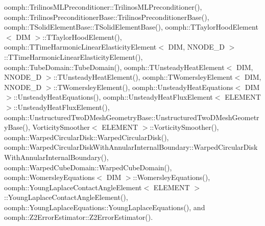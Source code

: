 oomph\+::\+Trilinos\+M\+L\+Preconditioner\+::\+Trilinos\+M\+L\+Preconditioner(), oomph\+::\+Trilinos\+Preconditioner\+Base\+::\+Trilinos\+Preconditioner\+Base(), oomph\+::\+T\+Solid\+Element\+Base\+::\+T\+Solid\+Element\+Base(), oomph\+::\+T\+Taylor\+Hood\+Element$<$ D\+I\+M $>$\+::\+T\+Taylor\+Hood\+Element(), oomph\+::\+T\+Time\+Harmonic\+Linear\+Elasticity\+Element$<$ D\+I\+M, N\+N\+O\+D\+E\+\_\+D $>$\+::\+T\+Time\+Harmonic\+Linear\+Elasticity\+Element(), oomph\+::\+Tube\+Domain\+::\+Tube\+Domain(), oomph\+::\+T\+Unsteady\+Heat\+Element$<$ D\+I\+M, N\+N\+O\+D\+E\+\_\+D $>$\+::\+T\+Unsteady\+Heat\+Element(), oomph\+::\+T\+Womersley\+Element$<$ D\+I\+M, N\+N\+O\+D\+E\+\_\+D $>$\+::\+T\+Womersley\+Element(), oomph\+::\+Unsteady\+Heat\+Equations$<$ D\+I\+M $>$\+::\+Unsteady\+Heat\+Equations(), oomph\+::\+Unsteady\+Heat\+Flux\+Element$<$ E\+L\+E\+M\+E\+N\+T $>$\+::\+Unsteady\+Heat\+Flux\+Element(), oomph\+::\+Unstructured\+Two\+D\+Mesh\+Geometry\+Base\+::\+Unstructured\+Two\+D\+Mesh\+Geometry\+Base(), Vorticity\+Smoother$<$ E\+L\+E\+M\+E\+N\+T $>$\+::\+Vorticity\+Smoother(), oomph\+::\+Warped\+Circular\+Disk\+::\+Warped\+Circular\+Disk(), oomph\+::\+Warped\+Circular\+Disk\+With\+Annular\+Internal\+Boundary\+::\+Warped\+Circular\+Disk\+With\+Annular\+Internal\+Boundary(), oomph\+::\+Warped\+Cube\+Domain\+::\+Warped\+Cube\+Domain(), oomph\+::\+Womersley\+Equations$<$ D\+I\+M $>$\+::\+Womersley\+Equations(), oomph\+::\+Young\+Laplace\+Contact\+Angle\+Element$<$ E\+L\+E\+M\+E\+N\+T $>$\+::\+Young\+Laplace\+Contact\+Angle\+Element(), oomph\+::\+Young\+Laplace\+Equations\+::\+Young\+Laplace\+Equations(), and oomph\+::\+Z2\+Error\+Estimator\+::\+Z2\+Error\+Estimator().

